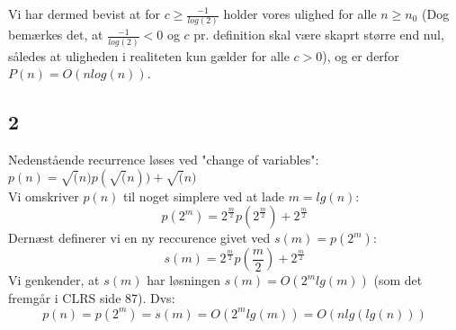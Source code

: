 Vi har dermed bevist at for $c \geq \frac{-1}{log(2)}$ holder vores ulighed for alle $n \geq n_0$ (Dog bemærkes det, at $\frac{-1}{log(2)} < 0$ og $c$ pr. definition skal være skaprt større end nul, således at uligheden i realiteten kun gælder for alle $c > 0$), og er derfor $P(n) = O(nlog(n))$.

\subsection{2}

Nedenstående recurrence løses ved "change of variables":\\
$p(n) = \sqrt(n)p(\sqrt(n)) + \sqrt(n)$\\
Vi omskriver $p(n)$ til noget simplere ved at lade $m = lg(n)$:
$$p(2^m) = 2^{\frac{m}{2}}p(2^{\frac{m}{2}}) + 2^{\frac{m}{2}}$$
Dernæst definerer vi en ny reccurence givet ved $s(m) = p(2^m)$:
$$s(m) = 2^{\frac{m}{2}}p(\frac{m}{2}) + 2^{\frac{m}{2}}$$
Vi genkender, at $s(m)$ har løsningen $s(m) = O(2^mlg(m))$ (som det fremgår i CLRS side 87).
Dvs:
$$p(n) = p(2^m) = s(m) = O(2^mlg(m)) = O(nlg(lg(n)))$$
